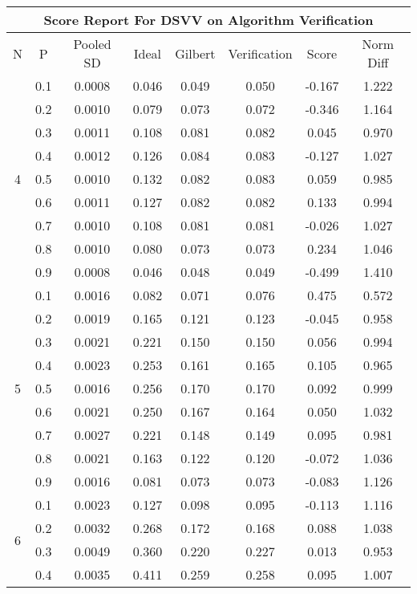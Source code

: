 \documentclass[11pt,a4paper]{report}
\begin{document}
\begin{longtable}{ | c | c || c | c | c | c | c | c | }
\hline
\multicolumn{8}{|c|}{ Score Report For DSVV on Algorithm Verification} \\
\hline
N & P & Pooled SD &  Ideal &  Gilbert & Verification  & Score & Norm Diff \\
 \hline
 \hline
 \endhead
\multirow{9}{*}{4} & 0.1 & 0.0008 & 0.046 & 0.049 & 0.050 & -0.167 & 1.222 \\
 & 0.2 & 0.0010 & 0.079 & 0.073 & 0.072 & -0.346 & 1.164 \\
 & 0.3 & 0.0011 & 0.108 & 0.081 & 0.082 & 0.045 & 0.970 \\
 & 0.4 & 0.0012 & 0.126 & 0.084 & 0.083 & -0.127 & 1.027 \\
 & 0.5 & 0.0010 & 0.132 & 0.082 & 0.083 & 0.059 & 0.985 \\
 & 0.6 & 0.0011 & 0.127 & 0.082 & 0.082 & 0.133 & 0.994 \\
 & 0.7 & 0.0010 & 0.108 & 0.081 & 0.081 & -0.026 & 1.027 \\
 & 0.8 & 0.0010 & 0.080 & 0.073 & 0.073 & 0.234 & 1.046 \\
 & 0.9 & 0.0008 & 0.046 & 0.048 & 0.049 & -0.499 & 1.410 \\
 \hline
\multirow{9}{*}{5} & 0.1 & 0.0016 & 0.082 & 0.071 & 0.076 & 0.475 & 0.572 \\
 & 0.2 & 0.0019 & 0.165 & 0.121 & 0.123 & -0.045 & 0.958 \\
 & 0.3 & 0.0021 & 0.221 & 0.150 & 0.150 & 0.056 & 0.994 \\
 & 0.4 & 0.0023 & 0.253 & 0.161 & 0.165 & 0.105 & 0.965 \\
 & 0.5 & 0.0016 & 0.256 & 0.170 & 0.170 & 0.092 & 0.999 \\
 & 0.6 & 0.0021 & 0.250 & 0.167 & 0.164 & 0.050 & 1.032 \\
 & 0.7 & 0.0027 & 0.221 & 0.148 & 0.149 & 0.095 & 0.981 \\
 & 0.8 & 0.0021 & 0.163 & 0.122 & 0.120 & -0.072 & 1.036 \\
 & 0.9 & 0.0016 & 0.081 & 0.073 & 0.073 & -0.083 & 1.126 \\
 \hline
\multirow{9}{*}{6} & 0.1 & 0.0023 & 0.127 & 0.098 & 0.095 & -0.113 & 1.116 \\
 & 0.2 & 0.0032 & 0.268 & 0.172 & 0.168 & 0.088 & 1.038 \\
 & 0.3 & 0.0049 & 0.360 & 0.220 & 0.227 & 0.013 & 0.953 \\
 & 0.4 & 0.0035 & 0.411 & 0.259 & 0.258 & 0.095 & 1.007 \\

\end{longtable}
\end{document}

